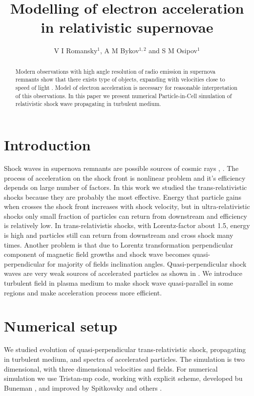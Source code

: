 \documentclass[a4paper]{jpconf}
\begin{document}
\title{Modelling of electron acceleration in relativistic supernovae}

\author{V I Romansky$^{1}$, A M Bykov$^{1,2}$ and S M Osipov$^1$}

\address{$^1$ Ioffe Institute, 26 Politekhnicheskaya st., St. Petersburg 194021, Russia}
\address{$^2$ Peter the Great St.~Petersburg Polytechnic University, 29 Politekhnicheskaya st., St. Petersburg 195251, Russia}


\begin{abstract}
	Modern observations with high angle resolution of radio emission in supernova remnants show that there exists type of objects, expanding with velocities close to speed of light \cite{Margutti}. Model of electron acceleration is necessary for reasonable interpretation of this observations. In this paper we present numerical Particle-in-Cell simulation of relativistic shock wave propagating in turbulent medium.
\end{abstract}
\section{Introduction}
Shock waves in supernova remnants are possible sources of cosmic rays \cite{Bell1978}, \cite{Blandford1978}. The process of acceleration on the shock front is nonlinear problem and it's efficiency depends on large number of factors. In this work we studied the trans-relativistic shocks because they are probably the most effective. Energy that particle gains when crosses the shock front increases with shock velocity, but in ultra-relativistic shocks only small fraction of particles can return from downstream and efficiency is relatively low. In trans-relativistis shocks, with Lorentz-factor about 1.5, energy is high and particles still can return from downstream and cross shock many times. Another problem is that due to Lorentz transformation perpendicular component of magnetic field growths and shock wave becomes quasi-perpendicular for majority of fields inclination angles. Quasi-perpendicular shock waves are very weak sources of accelerated particles as shown in . We introduce turbulent field in plasma medium to make shock wave quasi-parallel in some regions and make acceleration process more efficient.

\section{Numerical setup}
We studied evolution of quasi-perpendicular trans-relativistic shock, propagating in turbulent medium, and spectra of accelerated particles. The simulation is two dimensional, with three dimensional velocities and fields. For numerical simulation we use Tristan-mp code, working with explicit scheme, developed bu Buneman \cite{Buneman}, and improved by Spitkovsky and others \cite{Sironi2011}.
\end{document}
